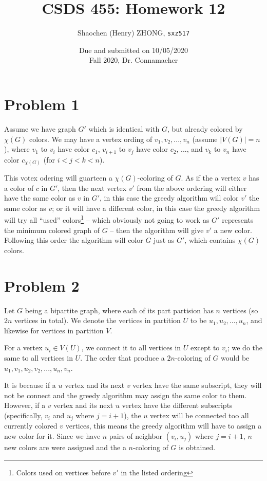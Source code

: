 \documentclass[11pt]{article}
\newcommand{\ilc}{\texttt}
\begin{document}
\title{\textbf{CSDS 455: Homework 12}}

\author{Shaochen (Henry) ZHONG, \ilc{sxz517}}
\date{Due and submitted on 10/05/2020 \\ Fall 2020, Dr. Connamacher}
\maketitle


\section*{Problem 1}

Assume we have graph $G'$ which is identical with $G$, but already colored by $\chi(G)$ colors. We may have a vertex ording of $v_1, v_2, ..., v_n$ (assume $|V(G)| = n$), where $v_1$ to $v_i$ have color $c_1$, $v_{i+1}$ to $v_{j}$ have color $c_2$, ..., and $v_k$ to $v_n$ have color $c_{\chi(G)}$ (for $i < j < k < n$).

This votex odering will guarteen a $\chi(G)$-coloring of $G$. As if the a vertex $v$ has a color of $c$ in $G'$, then the next vertex $v'$ from the above ordering will either have the same color as $v$ in $G'$, in this case the greedy algorithm will color $v'$ the same color as $v$; or it will have a different color, in this case the greedy algorithm will try all ``used'' colors\footnote{Colors used on vertices before $v'$ in the listed ordering} -- which obviously not going to work as $G'$ represents the minimum colored graph of $G$ -- then the algorithm will give $v'$ a new color. Following this order the algorithm will color $G$ just as $G'$, which contains $\chi(G)$ colors.


\section*{Problem 2}

Let $G$ being a bipartite graph, where each of its part partision has $n$ vertices (so $2n$ vertices in total). We denote the vertices in partition $U$ to be $u_1, u_2, ..., u_n$, and likewise for vertices in partition $V$.

For a vertex $u_i \in V(U)$, we connect it to all vertices in $U$ except to $v_i$; we do the same to all vertices in $U$. The order that produce a $2n$-coloring of $G$ would be $u_1, v_1, u_2, v_2, ..., u_n, v_n$.

It is because if a $u$ vertex and its next $v$ vertex have the same subscript, they will not be connect and the greedy algorithm may assign the same color to them. However, if a $v$ vertex and its next $u$ vertex have the different subscripts (specifically, $v_i$ and $u_j$ where $j = i+1$), the $u$ vertex will be connected too all currently colored $v$ vertices, this means the greedy algorithm will have to assign a new color for it. Since we have $n$ pairs of neighbor $(v_i, u_j)$ where $j = i+1$, $n$ new colors are were assigned and the a $n$-coloring of $G$ is obtained.
\end{document}
